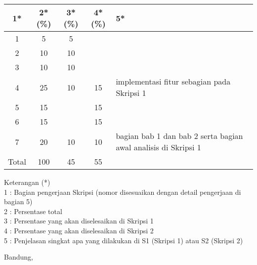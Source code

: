 \documentclass[a4paper,twoside]{article}
\begin{document}
\begin{center}
  	\begin{tabular}{ | c | c | c | c | l |}
    \hline
    1*  & 2*(\%) & 3*(\%) & 4*(\%) &5*\\ \hline \hline
    1   & 5  & 5  &  &  \\ \hline
    2   & 10 & 10 &  & \\ \hline
    3   & 10 & 10 &  &  \\ \hline
    4   & 25 & 10 & 15 &  {\footnotesize implementasi fitur sebagian pada Skripsi 1} \\ \hline
    5   & 15 &    & 15 &  \\ \hline
    6   & 15 &    & 15 & \\ \hline
    7   & 20 & 10 & 10 &  {\footnotesize bagian bab 1 dan bab 2 serta bagian awal analisis di Skripsi 1} \\ \hline
    Total  & 100  & 45  & 55 &  \\ \hline
	\end{tabular}
\end{center}

Keterangan (*)\\
1 : Bagian pengerjaan Skripsi (nomor disesuaikan dengan detail pengerjaan di bagian 5)\\
2 : Persentase total \\
3 : Persentase yang akan diselesaikan di Skripsi 1 \\
4 : Persentase yang akan diselesaikan di Skripsi 2 \\
5 : Penjelasan singkat apa yang dilakukan di S1 (Skripsi 1) atau S2 (Skripsi 2)

\vspace{1cm}
\centering Bandung, \tanggal\\
\vspace{2cm} \nama \\ 
\vspace{1cm}
\end{document}

